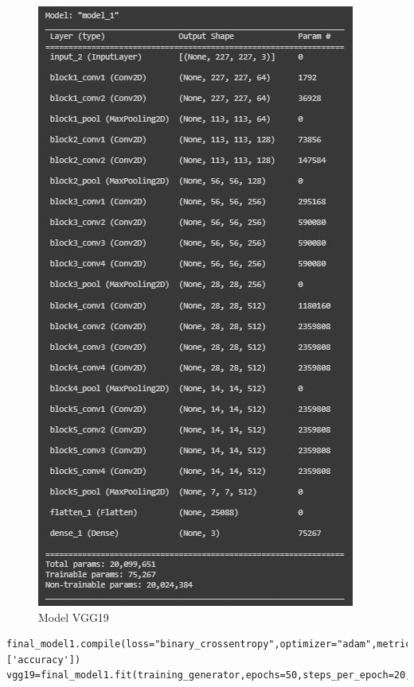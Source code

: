 \begin{center}
    \begin{figure}[!h]
        \centering
        \includegraphics[scale = 1]{fileanh/26.jpg}
        \caption{Model VGG19}
    \end{figure}
\end{center}

\begin{lstlisting}
final_model1.compile(loss="binary_crossentropy",optimizer="adam",metrics=['accuracy'])
vgg19=final_model1.fit(training_generator,epochs=50,steps_per_epoch=20,validation_data=validation_generator)
\end{lstlisting}

